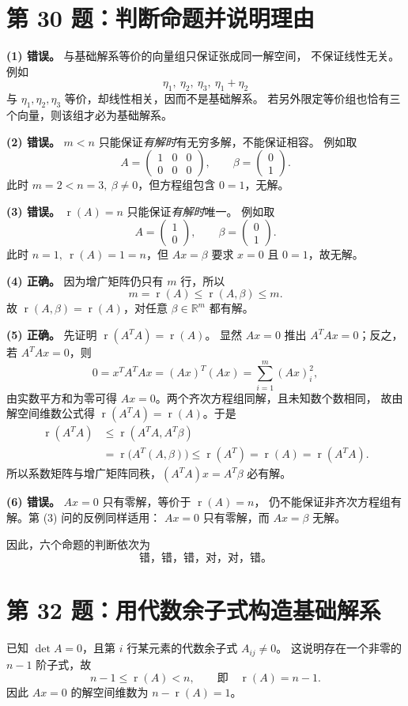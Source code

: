 \documentclass[11pt,a4paper,fontset=fandol]{ctexart}
\newcommand{\problem}[1]{\Needspace{6\baselineskip}\section*{#1}}
\newcommand{\ans}[1]{\boxed{#1}}
\newcommand{\rank}{\operatorname{r}}
\newcommand{\R}{\mathbb R}
\begin{document}
\newpage
\problem{第 30 题：判断命题并说明理由}
\textbf{(1) 错误。} 与基础解系等价的向量组只保证张成同一解空间，
不保证线性无关。例如
\[
\eta_1,\ \eta_2,\ \eta_3,\ \eta_1+\eta_2
\]
与 $\eta_1,\eta_2,\eta_3$ 等价，却线性相关，因而不是基础解系。
若另外限定等价组也恰有三个向量，则该组才必为基础解系。

\medskip
\textbf{(2) 错误。} $m<n$ 只能保证\emph{有解时}有无穷多解，不能保证相容。
例如取
\[
A=\begin{pmatrix}1&0&0\\0&0&0\end{pmatrix},\qquad
\beta=\begin{pmatrix}0\\1\end{pmatrix}.
\]
此时 $m=2<n=3,\ \beta\ne0$，但方程组包含 $0=1$，无解。

\medskip
\textbf{(3) 错误。} $\rank(A)=n$ 只能保证\emph{有解时}唯一。
例如取
\[
A=\begin{pmatrix}1\\0\end{pmatrix},\qquad
\beta=\begin{pmatrix}0\\1\end{pmatrix}.
\]
此时 $n=1,\ \rank(A)=1=n$，但 $Ax=\beta$ 要求 $x=0$ 且 $0=1$，故无解。

\medskip
\textbf{(4) 正确。} 因为增广矩阵仍只有 $m$ 行，所以
\[
m=\rank(A)\le\rank(A,\beta)\le m.
\]
故 $\rank(A,\beta)=\rank(A)$，对任意 $\beta\in\R^m$ 都有解。

\medskip
\textbf{(5) 正确。} 先证明 $\rank(A^TA)=\rank(A)$。
显然 $Ax=0$ 推出 $A^TAx=0$；反之，若 $A^TAx=0$，则
\[
0=x^TA^TAx=(Ax)^T(Ax)=\sum_{i=1}^{m}(Ax)_i^2,
\]
由实数平方和为零可得 $Ax=0$。两个齐次方程组同解，且未知数个数相同，
故由解空间维数公式得 $\rank(A^TA)=\rank(A)$。于是
\[
\begin{aligned}
\rank(A^TA)
&\le\rank(A^TA,A^T\beta)\\
&=\rank\bigl(A^T(A,\beta)\bigr)
\le\rank(A^T)=\rank(A)=\rank(A^TA).
\end{aligned}
\]
所以系数矩阵与增广矩阵同秩，$(A^TA)x=A^T\beta$ 必有解。

\medskip
\textbf{(6) 错误。} $Ax=0$ 只有零解，等价于 $\rank(A)=n$，
仍不能保证非齐次方程组有解。第 (3) 问的反例同样适用：
$Ax=0$ 只有零解，而 $Ax=\beta$ 无解。

\medskip
因此，六个命题的判断依次为
\[
\ans{\text{错，错，错，对，对，错。}}
\]

\newpage
\problem{第 32 题：用代数余子式构造基础解系}
已知 $\det A=0$，且第 $i$ 行某元素的代数余子式 $A_{ij}\ne0$。
这说明存在一个非零的 $n-1$ 阶子式，故
\[
n-1\le\rank(A)<n,\qquad\text{即}\quad\rank(A)=n-1.
\]
因此 $Ax=0$ 的解空间维数为 $n-\rank(A)=1$。
\end{document}
